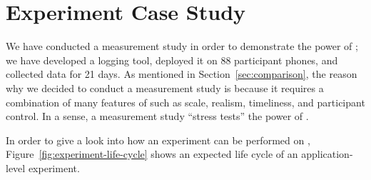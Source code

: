 \begin{figure*}[t]
\caption{Expected Life Cycle of a \PhoneLab{} Application-Level Experiment}
\label{fig:experiment-life-cycle}
\end{figure*}

\section{Experiment Case Study}
\label{sec-experiment}

We have conducted a measurement study in order to demonstrate the power of
\PhoneLab{}; we have developed a logging tool, deployed it on 88 participant
phones, and collected data for 21 days. As mentioned in
Section~\ref{sec:comparison}, the reason why we decided to conduct a measurement
study is because it requires a combination of many features of \PhoneLab{} such
as scale, realism, timeliness, and participant control. In a sense, a
measurement study ``stress tests'' the power of \PhoneLab{}.

In order to give a look into how an experiment can be performed on \PhoneLab{},
Figure~\ref{fig:experiment-life-cycle} shows an expected life cycle of an
application-level experiment. 

